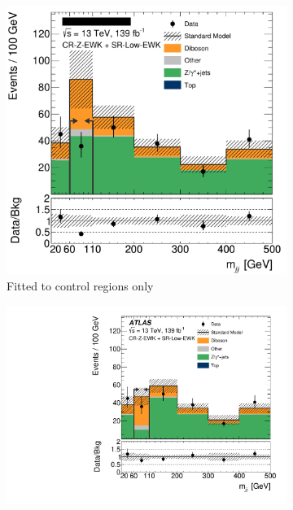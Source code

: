 \begin{figure}[tp]
\centering
\begin{subfigure}{0.48\textwidth}
\centering
\includegraphics[width=\textwidth]{figures/2ljets_aux_CR_Z_EWKSR_Low_EWK_mjj_no_sr.png}
\caption{Fitted to control regions only}
\label{fig:2ljets_low_crz_pre_post_pre}
\end{subfigure}
\hfill
\begin{subfigure}{0.48\textwidth}
\centering
\includegraphics[width=\textwidth]{figures/2ljets_aux_CR_Z_EWKSR_Low_EWK_mjj.pdf}

\end{subfigure}
\end{figure}
